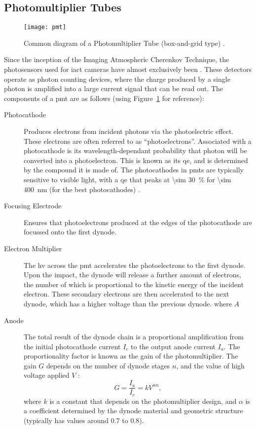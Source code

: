 \subsection{Photomultiplier Tubes}

\begin{figure}
	\centering
    \texttt{[image: pmt]} 
	\caption[Diagram of a Photomultiplier Tube.]{Common diagram of a Photomultiplier Tube (box-and-grid type) \cite{Hamamatsu2016}.}
	\label{fig:pmt}
\end{figure}

Since the inception of the Imaging Atmospheric Cherenkov Technique, the photosensors used for \gls{iact} cameras have almost exclusively been  \cite{Weekes2003}. These detectors operate as photon counting devices, where the charge produced by a single photon is amplified into a large current signal that can be read out. The components of a \gls{pmt} are as follows (using Figure~\ref{fig:pmt} for reference):
\begin{description}
\item [Photocathode] Produces electrons from incident photons via the photoelectric effect. These electrons are often referred to as ``photoelectrons''. Associated with a photocathode is its wavelength-dependant probability that photon will be converted into a photoelectron. This is known as its \gls{qe}, and is determined by the compound it is made of. The photocathodes in \glspl{pmt} are typically sensitive to visible light, with a \gls{qe} that peaks at \SI{\sim 30}{\percent} for \SI{\sim 400}{nm} (for the best photocathodes) \cite{Hamamatsu2016}.
\item [Focusing Electrode] Ensures that photoelectrons produced at the edges of the photocathode are focussed onto the first dynode.
\item [Electron Multiplier] The \gls{hv} across the \gls{pmt} accelerates the photoelectrons to the first dynode. Upon the impact, the dynode will release a further amount of electrons, the number of which is proportional to the kinetic energy of the incident electron. These secondary electrons are then accelerated to the next dynode, which has a higher voltage than the previous dynode. 
where $A$ 
\item [Anode] The total result of the dynode chain is a proportional amplification from the initial photocathode current $I_c$ to the output anode current $I_a$. The proportionality factor is known as the gain of the photomultiplier. The gain $G$ depends on the number of dynode stages $n$, and the value of high voltage applied $V$ \cite{Hamamatsu2016}:
\begin{equation} \label{eq:pmt_gain}
G = \frac{I_a}{I_c} = k V^{\alpha n},
\end{equation}
where $k$ is a constant that depends on the photomultiplier design, and $\alpha$ is a coefficient determined by the dynode material and geometric structure (typically has values around 0.7 to 0.8).
\end{description}

